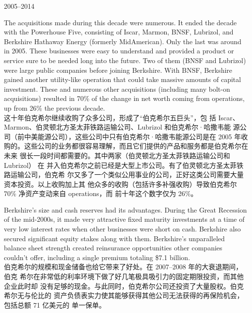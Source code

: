 \begin{section}{2005--2014}
\begin{verseparallel}
  {
    The acquisitions made during this decade were numerous. It ended the decade
    with the Powerhouse Five, consisting of Iscar, Marmon, BNSF, Lubrizol, and
    Berkshire Hathaway Energy (formerly MidAmerican). Only the last was around
    in 2005. These businesses were easy to understand and provided a product or
    service sure to be needed long into the future. Two of them (BNSF and
    Lubrizol) were large public companies before joining Berkshire. With BNSF,
    Berkshire gained another utility-like operation that could take massive
    amounts of capital investment. These and numerous other acquisitions
    (including many bolt-on acquisitions) resulted in 70\% of
    the change in net worth coming from operations, up from 26\% the previous
    decade. \\
  }
  {
    这十年伯克希尔继续收购了众多公司，形成了“伯克希尔五巨头”，包
    括 Iscar、Marmon、伯灵顿北方圣太菲铁路运输公司、Lubrizol 和伯克希尔·哈撒韦能
    源公司（前中美能源公司），这些公司中只有伯克希尔·哈撒韦能源公司是在 2005 年收
    购的。这些公司的业务都很容易理解，而且它们提供的产品和服务都是伯克希尔在未来
    很长一段时间都需要的。其中两家（伯灵顿北方圣太菲铁路运输公司和 Lubrizol） 在
    并入伯克希尔之前已经是大型上市公司。有了伯灵顿北方圣太菲铁路运输公司，伯克希
    尔又多了一个类似公用事业的公司，正好这类公司需要大量资本投资。以上收购加上其
    他众多的收购（包括许多补强收购）导致伯克希尔 70\% 净资产变动来自 operations，而
    前十年这个数字仅为 26\%。
  }
\end{verseparallel}

\begin{verseparallel}
  {
    Berkshire's size and cash reserves had its advantages. During the Great
    Recession of the mid-2000s, it made very attractive fixed maturity
    investments at a time of very low interest rates when other businesses were
    short on cash. Berkshire also secured significant equity stakes along with
    them. Berkshire's unparalleled balance sheet strength created reinsurance
    opportunities other companies couldn't offer, including a single premium
    totaling \$7.1 billion. \\
  }
  {
    伯克希尔的规模和现金储备也给它带来了好处。在 2007--2008 年的大衰退期间，伯克
    希尔在非常低的利率环境下做了好几笔极具吸引力的固定期限投资，而其他企业此时却
    没有足够的现金。与此同时，伯克希尔公司还投资了大量股权。伯克希尔无与伦比的
    资产负债表实力使其能够获得其他公司无法获得的再保险机会，包括总额 71 亿美元的
    单一保单。
  }
\end{verseparallel}
\end{section}

